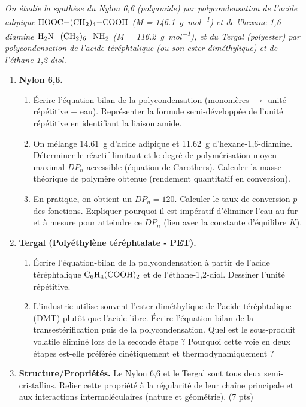 \documentclass[11pt]{article}
\begin{document}
\begin{exercice}
\emph{On étudie la synthèse du Nylon 6,6 (polyamide) par polycondensation de l'acide adipique $\ce{HOOC-(CH2)4-COOH}$ (M = \SI{146,1}{g.mol^{-1}}) et de l'hexane-1,6-diamine $\ce{H2N-(CH2)6-NH2}$ (M = \SI{116,2}{g.mol^{-1}}), et du Tergal (polyester) par polycondensation de l'acide téréphtalique (ou son ester diméthylique) et de l'éthane-1,2-diol.}
\begin{enumerate}
    \item \textbf{Nylon 6,6.}
    \begin{enumerate}
        \item Écrire l'équation-bilan de la polycondensation (monomères $\rightarrow$ unité répétitive + eau). Représenter la formule semi-développée de l'unité répétitive en identifiant la liaison amide.
        \item On mélange \SI{14,61}{g} d'acide adipique et \SI{11,62}{g} d'hexane-1,6-diamine. Déterminer le réactif limitant et le degré de polymérisation moyen maximal $DP_n$ accessible (équation de Carothers). Calculer la masse théorique de polymère obtenue (rendement quantitatif en conversion).
        \item En pratique, on obtient un $DP_n = 120$. Calculer le taux de conversion $p$ des fonctions. Expliquer pourquoi il est impératif d'éliminer l'eau au fur et à mesure pour atteindre ce $DP_n$ (lien avec la constante d'équilibre $K$).
    \end{enumerate}
    \item \textbf{Tergal (Polyéthylène téréphtalate - PET).}
    \begin{enumerate}
        \item Écrire l'équation-bilan de la polycondensation à partir de l'acide téréphtalique $\ce{C6H4(COOH)2}$ et de l'éthane-1,2-diol. Dessiner l'unité répétitive.
        \item L'industrie utilise souvent l'ester diméthylique de l'acide téréphtalique (DMT) plutôt que l'acide libre. Écrire l'équation-bilan de la transestérification puis de la polycondensation. Quel est le sous-produit volatile éliminé lors de la seconde étape ? Pourquoi cette voie en deux étapes est-elle préférée cinétiquement et thermodynamiquement ?
    \end{enumerate}
    \item \textbf{Structure/Propriétés.} Le Nylon 6,6 et le Tergal sont tous deux semi-cristallins. Relier cette propriété à la régularité de leur chaîne principale et aux interactions intermoléculaires (nature et géométrie). \hfill (7 pts)
\end{enumerate}
\end{exercice}
\end{document}
